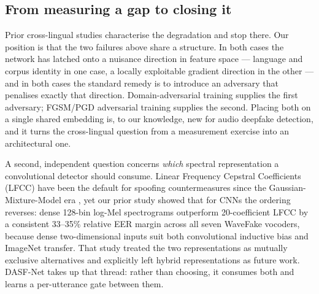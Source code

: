 \documentclass[conference]{IEEEtran}
\renewcommand{\cite}[1]{\unskip}
\begin{document}
\subsection{From measuring a gap to closing it}
Prior cross-lingual studies characterise the degradation and stop there.
Our position is that the two failures above share a structure. In both
cases the network has latched onto a nuisance direction in feature space
--- language and corpus identity in one case, a locally exploitable
gradient direction in the other --- and in both cases the standard remedy
is to introduce an adversary that penalises exactly that direction.
Domain-adversarial training \cite{ganin2016dann} supplies the first adversary;
FGSM/PGD adversarial training \cite{goodfellow2015fgsm,madry2018pgd}
supplies the second. Placing both on a single shared embedding is, to our
knowledge, new for audio deepfake detection, and it turns the cross-lingual
question from a measurement exercise into an architectural one.

A second, independent question concerns \emph{which} spectral
representation a convolutional detector should consume. Linear Frequency
Cepstral Coefficients (LFCC) have been the default for spoofing
countermeasures since the Gaussian-Mixture-Model era \cite{frank2021wavefake},
yet our prior study showed that for CNNs the ordering reverses:
dense 128-bin log-Mel spectrograms outperform 20-coefficient LFCC by a
consistent 33--35\% relative EER margin across all seven WaveFake vocoders,
because dense two-dimensional inputs suit both convolutional inductive bias
and ImageNet transfer. That study treated the two representations as
mutually exclusive alternatives and explicitly left hybrid representations
as future work. DASF-Net takes up that thread: rather than choosing, it
consumes both and learns a per-utterance gate between them.
\end{document}
